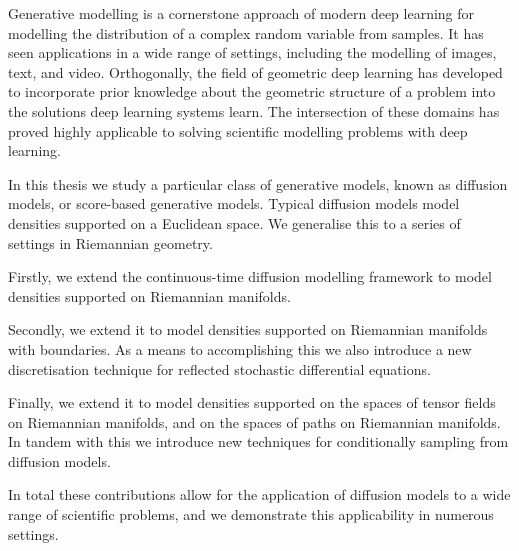 Generative modelling is a cornerstone approach of modern deep learning for modelling the distribution of a complex random variable from samples.
It has seen applications in a wide range of settings, including the modelling of images, text, and video.
Orthogonally, the field of geometric deep learning has developed to incorporate prior knowledge about the geometric structure of a problem into the solutions deep learning systems learn.
The intersection of these domains has proved highly applicable to solving scientific modelling problems with deep learning.

In this thesis we study a particular class of generative models, known as diffusion models, or score-based generative models.
Typical diffusion models model densities supported on a Euclidean space.
We generalise this to a series of settings in Riemannian geometry.

Firstly, we extend the continuous-time diffusion modelling framework to model densities supported on Riemannian manifolds.

Secondly, we extend it to model densities supported on Riemannian manifolds with boundaries.
As a means to accomplishing this we also introduce a new discretisation technique for reflected stochastic differential equations.

Finally, we extend it to model densities supported on the spaces of tensor fields on Riemannian manifolds, and on the spaces of paths on Riemannian manifolds.
In tandem with this we introduce new techniques for conditionally sampling from diffusion models.

In total these contributions allow for the application of diffusion models to a wide range of scientific problems, and we demonstrate this applicability in numerous settings.